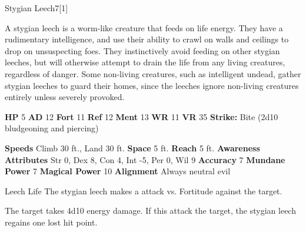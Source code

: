   \begin{monsection}{Stygian Leech}{7}[1]
    \vspace{-1em}\vspace{-1em}
    \vspace{0em}

    
      A stygian leech is a worm-like creature that feeds on life energy.
      They have a rudimentary intelligence, and use their ability to crawl on walls and ceilings to drop on unsuspecting foes.
      They instinctively avoid feeding on other stygian leeches, but will otherwise attempt to drain the life from any living creatures, regardless of danger.
      Some non-living creatures, such as intelligent undead, gather stygian leeches to guard their homes, since the leeches ignore non-living creatures entirely unless severely provoked.
    
    

    \begin{spellcontent}
      \begin{spelltargetinginfo}
        \pari \textbf{HP} 5 \monsep
          \textbf{AD} 12 \monsep
          \textbf{Fort} 11 \monsep
          \textbf{Ref} 12 \monsep
          \textbf{Ment} 13
        \pari \textbf{WR} 11 \monsep
        \textbf{VR} 35
        \pari \textbf{Strike:}
            Bite  (2d10 bludgeoning and piercing)
      \end{spelltargetinginfo}
    \end{spellcontent}
    \begin{monsterfooter}
      \pari \textbf{Speeds} Climb 30 ft., Land 30 ft. \monsep
        \textbf{Space} 5 ft. \monsep
        \textbf{Reach} 5 ft.
      \pari \textbf{Awareness} 
      \pari \textbf{Attributes}
        Str 0, Dex 8,
        Con 4, Int -5,
        Per 0, Wil 9
      \pari \textbf{Accuracy} 7 \monsep
        \textbf{Mundane Power} 7 \monsep
      \textbf{Magical Power} 10
      \pari \textbf{Alignment} Always neutral evil
    \end{monsterfooter}
  \end{monsection}
  \begin{freeability}{Leech Life}
       The stygian leech makes a  attack
        vs. Fortitude against the target.
    
    \hit 
          The target takes 4d10 energy damage.
          If this attack  the target, the stygian leech regains one lost hit point.
    \end{freeability}
  
